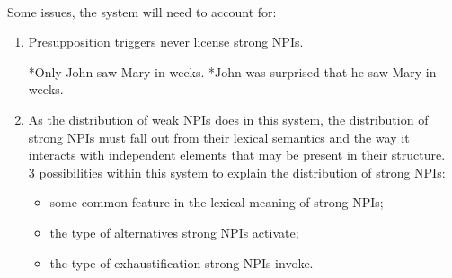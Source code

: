 \documentclass[a4paper,11pt]{article}
\begin{document}
\paragraph{}
Some issues, the system will need to account for:
\begin{enumerate}
\item Presupposition triggers never license strong NPIs.
\begin{exe}
\ex\label{presuptrig} \begin{xlist}
\ex\label{presuptriga} *Only John saw Mary in weeks. 
\ex\label{presuptrigb} *John was surprised that he saw Mary in weeks.
\end{xlist}
\end{exe}
\item As the distribution of weak NPIs does in this system, the distribution of strong NPIs must fall out from their lexical semantics and the way it interacts with independent elements that may be present in their structure. \\3 possibilities within this system to explain the distribution of strong NPIs:
\begin{itemize}
\item some common feature in the lexical meaning of strong NPIs;
\item the type of alternatives strong NPIs activate;
\item the type of exhaustification strong NPIs invoke.
\end{itemize}
\end{enumerate}
\paragraph{}
\end{document}
